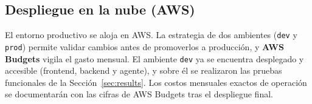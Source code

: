 \subsection{Despliegue en la nube (AWS)}

El entorno productivo se aloja en AWS. La estrategia de dos ambientes
(\texttt{dev} y \texttt{prod}) permite validar cambios antes de promoverlos a
producci\'on, y \textbf{AWS Budgets} vigila el gasto mensual. El ambiente
\texttt{dev} ya se encuentra desplegado y accesible (frontend, backend y agente),
y sobre \'el se realizaron las pruebas funcionales de la
Secci\'on~\ref{sec:results}. Los costos mensuales exactos de operaci\'on se
documentar\'an con las cifras de AWS Budgets tras el despliegue final.
